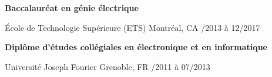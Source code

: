 \begin{textblock}{13.5}

			\centerline{\textbf{\large{Baccalaur\'eat en g\'enie \'electrique}}}
			\'Ecole de Technologie Sup\'erieure (ETS) \textbullet{} Montr\'eal, CA /2013 \`a 12/2017 \\

			\centerline{\textbf{\large{Dipl\^ome d'\'etudes coll\'egiales en \'electronique et en informatique}}}
			Universit\'e Joseph Fourier \textbullet{} Grenoble, FR /2011 \`a 07/2013 \\
	\end{textblock}

